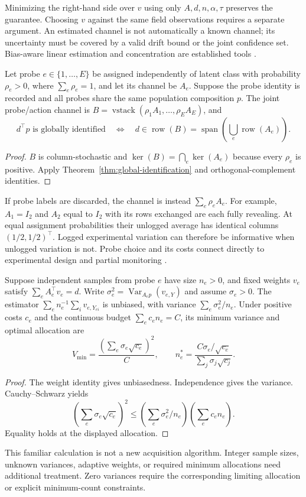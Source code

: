 Minimizing the right-hand side over $v$ using only $A,d,n,\alpha,\tau$ preserves
the guarantee. Choosing $v$ against the same field observations requires a
separate argument. An estimated channel is not automatically a known channel;
its uncertainty must be covered by a valid drift bound or the joint confidence
set. Bias-aware linear estimation and concentration are established tools
\citep{donoho1994,lattimore2020}.

\begin{theorem}
\label{thm:logged-probes}
Let probe $e\in\{1,\ldots,E\}$ be assigned independently of latent class with
probability $\rho_e>0$, where $\sum_e\rho_e=1$, and let its channel be $A_e$.
Suppose the probe identity is recorded and all probes share the same population
composition $p$. The joint probe/action channel is
$B=\operatorname{vstack}(\rho_1A_1,\ldots,\rho_EA_E)$, and
\[
 d^\top p\text{ is globally identified}
 \quad\Longleftrightarrow\quad
 d\in\operatorname{row}(B)
 =\operatorname{span}\!\left(\bigcup_e\operatorname{row}(A_e)\right).
\]
\end{theorem}
\begin{proof}
$B$ is column-stochastic and
$\ker(B)=\bigcap_e\ker(A_e)$ because every $\rho_e$ is positive. Apply
Theorem~\ref{thm:global-identification} and orthogonal-complement identities.
\end{proof}

If probe labels are discarded, the channel is instead $\sum_e\rho_e A_e$.
For example, $A_1=I_2$ and $A_2$ equal to $I_2$ with its rows exchanged are each
fully revealing. At equal assignment probabilities their unlogged average has
identical columns $(1/2,1/2)^\top$. Logged experimental variation can therefore
be informative when unlogged variation is not. Probe choice and its costs
connect directly to experimental design and partial monitoring
\citep{kirschner2023,lattimore2020}.

\begin{proposition}
\label{prop:cost-allocation}
Suppose independent samples from probe $e$ have size $n_e>0$, and fixed weights
$v_e$ satisfy $\sum_e A_e^\top v_e=d$. Write
$\sigma_e^2=\operatorname{Var}_{A_ep}(v_{e,Y})$ and assume $\sigma_e>0$.
The estimator $\sum_e n_e^{-1}\sum_i v_{e,Y_{ei}}$ is unbiased, with variance
$\sum_e\sigma_e^2/n_e$. Under positive costs $c_e$ and the continuous budget
$\sum_e c_en_e=C$, its minimum variance and optimal allocation are
\[
 V_{\min}=\frac{(\sum_e\sigma_e\sqrt{c_e})^2}{C},\qquad
 n_e^*=\frac{C\sigma_e/\sqrt{c_e}}{\sum_j\sigma_j\sqrt{c_j}}.
\]
\end{proposition}
\begin{proof}
The weight identity gives unbiasedness. Independence gives the variance.
Cauchy--Schwarz yields
\[
 (\sum_e\sigma_e\sqrt{c_e})^2
 \leq (\sum_e\sigma_e^2/n_e)(\sum_e c_en_e).
\]
Equality holds at the displayed allocation.
\end{proof}
This familiar calculation is not a new acquisition algorithm. Integer sample
sizes, unknown variances, adaptive weights, or required minimum allocations
need additional treatment. Zero variances require the corresponding limiting
allocation or explicit minimum-count constraints.

